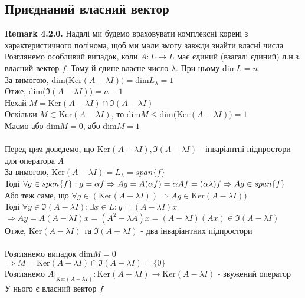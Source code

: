 \documentclass[a4paper, 14pt]{extarticle}
\def\rm#1{\textbf{Remark {#1}}}
\def\bigline{\vspace{5mm}\\}
\def\dim#1{\textrm{dim} {#1}}
\begin{document}
\subsection{Приєднаний власний вектор}
\rm{4.2.0.} Надалі ми будемо враховувати комплексні корені з \\ характеристичного полінома, щоб ми мали змогу завжди знайти власні числа
\bigline
Розглянемо особливий випадок, коли $A: L \to L$ має єдиний (взагалі єдиний) л.н.з. власний вектор $f$. Тому й єдине власне число $\lambda$. При цьому $\dim L = n$\\
За вимогою, $\dim (\textrm{Ker}(A - \lambda I)) = \dim L_{\lambda} = 1$\\
Отже, $\dim (\Im (A - \lambda I)) = n-1$\\
Нехай $M=\textrm{Ker}(A-\lambda I) \cap \Im(A-\lambda I)$\\
Оскільки $M \subset \textrm{Ker} (A-\lambda I)$, то $\dim M \leq \dim(\textrm{Ker} (A-\lambda I)) = 1$ \\
Маємо або $\dim M = 0$, або $\dim M = 1$\\
\\
Перед цим доведемо, що $\textrm{Ker}(A - \lambda I), \Im(A-\lambda I)$ - інваріантні підпростори для оператора $A$\\
За вимогою, $\textrm{Ker}(A-\lambda I) = L_{\lambda} = span\{f\}$\\
Тоді $\forall g \in span\{f\}: g = \alpha f \Rightarrow Ag = A(\alpha f) = \alpha Af = (\alpha \lambda) f \\ \Rightarrow Ag \in span\{f\}$\\
Або теж саме, що $\forall g \in (\textrm{Ker}(A - \lambda I)) \Rightarrow Ag \in  \textrm{Ker}(A - \lambda I))$
\bigline
Тоді $\forall y \in \Im(A-\lambda I): \exists x \in L: y = (A-\lambda I)x$\\
$\Rightarrow Ay = A(A-\lambda I)x = (A^2-\lambda A)x = (A-\lambda I)(Ax) \in \Im(A-\lambda I)$\\
Отже, $\textrm{Ker}(A-\lambda I)$ та $\Im(A-\lambda I)$ - два інваріантних підпростори\\
\\
Розглянемо випадок $\dim M = 0$\\
$\Rightarrow M = \textrm{Ker}(A-\lambda I) \cap \Im(A-\lambda I) = \{0\}$\\
Розглянемо $A |_{\textrm{Ker}(A-\lambda I)}: \textrm{Ker}(A-\lambda I) \to \textrm{Ker}(A-\lambda I)$ - звужений оператор\\
У нього є власний вектор $f$\\
\end{document}
